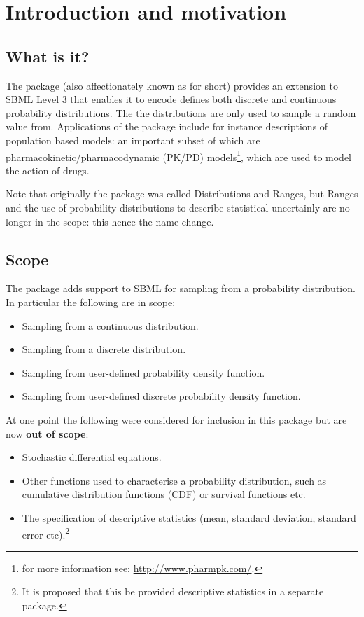 \documentclass[draftspec]{sbmlpkgspec}
\begin{document}
\section{Introduction and motivation}

\subsection{What is it?}

The \distrib package (also affectionately known as \distribshort for
short) provides an extension to SBML Level 3 that enables it to encode
defines both discrete and continuous probability distributions. The
the distributions are only used to sample a random value from.
Applications of the package include for instance descriptions of
population based models: an important subset of which are
pharmacokinetic/pharmacodynamic (PK/PD) models\footnote{for more
  information see: \url{http://www.pharmpk.com/}.}, which are used to
model the action of drugs.

Note that originally the package was called Distributions and Ranges,
but Ranges and the use of probability distributions to describe
statistical uncertainly are no longer in the scope: this hence the name change.

\subsection{Scope}

The \distrib package adds support to SBML for sampling from a
probability distribution. In particular the following are in scope:

\begin{itemize}
\item Sampling from a continuous distribution.
\item Sampling from a discrete distribution.
\item Sampling from user-defined probability density function.
\item Sampling from user-defined discrete probability density function.
\end{itemize}

At one point the following were considered for inclusion in this
package but are now \textbf{out of scope}:

\begin{itemize}
\item Stochastic differential equations.
\item Other functions used to characterise a probability distribution,
  such as cumulative distribution functions (CDF) or survival functions etc.
\item The specification of descriptive statistics (mean, standard
  deviation, standard error etc).\footnote{It is proposed that this be
    provided descriptive statistics in a separate package.}
\end{itemize}
\end{document}
